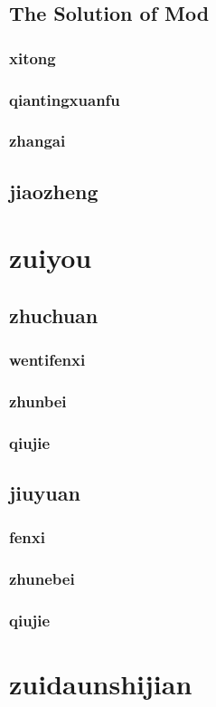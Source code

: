 \documentclass{mcmthesis}  %
\begin{document}
\subsection{The Solution of Mod}
\subsubsection{xitong}
\subsubsection{qiantingxuanfu}
\subsubsection{zhangai}
\subsection{jiaozheng}
\section{zuiyou}
\subsection{zhuchuan}
\subsubsection{wentifenxi}
\subsubsection{zhunbei}
\subsubsection{qiujie}
\subsection{jiuyuan}
\subsubsection{fenxi}
\subsubsection{zhunebei}
\subsubsection{qiujie}
\section{zuidaunshijian}
\end{document}
